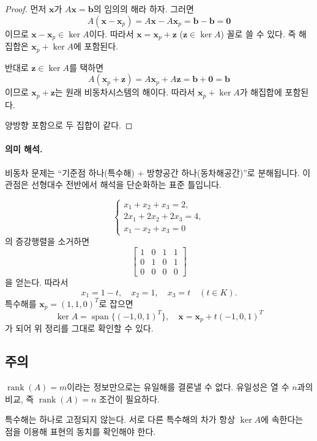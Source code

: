 \begin{proof}
먼저 $\mathbf{x}$가 $A\mathbf{x}=\mathbf{b}$의 임의의 해라 하자. 그러면
\[
A(\mathbf{x}-\mathbf{x}_p)=A\mathbf{x}-A\mathbf{x}_p=\mathbf{b}-\mathbf{b}=\mathbf{0}
\]
이므로 $\mathbf{x}-\mathbf{x}_p\in\ker A$이다. 따라서 $\mathbf{x}=\mathbf{x}_p+\mathbf{z}$ ($\mathbf{z}\in\ker A$) 꼴로 쓸 수 있다. 즉 해집합은 $\mathbf{x}_p+\ker A$에 포함된다.

반대로 $\mathbf{z}\in\ker A$를 택하면
\[
A(\mathbf{x}_p+\mathbf{z})=A\mathbf{x}_p+A\mathbf{z}=\mathbf{b}+\mathbf{0}=\mathbf{b}
\]
이므로 $\mathbf{x}_p+\mathbf{z}$는 원래 비동차시스템의 해이다. 따라서 $\mathbf{x}_p+\ker A$가 해집합에 포함된다.

양방향 포함으로 두 집합이 같다.
\end{proof}

\paragraph{의미 해석.}
비동차 문제는 ``기준점 하나(특수해) + 방향공간 하나(동차해공간)''로 분해됩니다. 이 관점은 선형대수 전반에서 해석을 단순화하는 표준 틀입니다.

\begin{example}
\[
\begin{cases}
x_1+x_2+x_3=2,\\
2x_1+2x_2+2x_3=4,\\
x_1-x_2+x_3=0
\end{cases}
\]
의 증강행렬을 소거하면
\[
\left[
\begin{array}{ccc|c}
1&0&1&1\\
0&1&0&1\\
0&0&0&0
\end{array}
\right]
\]
을 얻는다. 따라서
\[
x_1=1-t,\quad x_2=1,\quad x_3=t\quad (t\in K).
\]
특수해를 $\mathbf{x}_p=(1,1,0)^T$로 잡으면
\[
\ker A=\operatorname{span}\{(-1,0,1)^T\},
\quad
\mathbf{x}=\mathbf{x}_p+t(-1,0,1)^T
\]
가 되어 위 정리를 그대로 확인할 수 있다.
\end{example}

\subsection*{주의}
\begin{warning}
$\operatorname{rank}(A)=m$이라는 정보만으로는 유일해를 결론낼 수 없다. 유일성은 열 수 $n$과의 비교, 즉 $\operatorname{rank}(A)=n$ 조건이 필요하다.
\end{warning}
\begin{warning}
특수해는 하나로 고정되지 않는다. 서로 다른 특수해의 차가 항상 $\ker A$에 속한다는 점을 이용해 표현의 동치를 확인해야 한다.
\end{warning}

